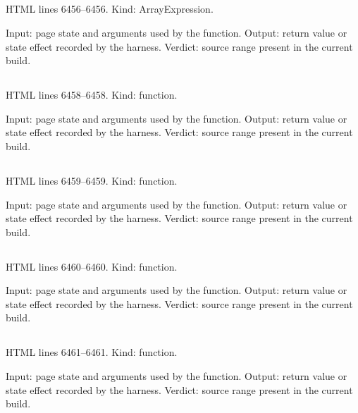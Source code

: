 \subsection*{\texttt{}}
\label{vf_302_CC_SEG_PALETTE}
HTML lines 6456--6456. Kind: ArrayExpression.

Input: page state and arguments used by the function.
Output: return value or state effect recorded by the harness.
Verdict: source range present in the current build.

\subsection*{\texttt{}}
\label{vf_303_ccSignal}
HTML lines 6458--6458. Kind: function.

Input: page state and arguments used by the function.
Output: return value or state effect recorded by the harness.
Verdict: source range present in the current build.

\subsection*{\texttt{}}
\label{vf_304_ccPlatform}
HTML lines 6459--6459. Kind: function.

Input: page state and arguments used by the function.
Output: return value or state effect recorded by the harness.
Verdict: source range present in the current build.

\subsection*{\texttt{}}
\label{vf_305_ccInstrumentKey}
HTML lines 6460--6460. Kind: function.

Input: page state and arguments used by the function.
Output: return value or state effect recorded by the harness.
Verdict: source range present in the current build.

\subsection*{\texttt{}}
\label{vf_306_ccOperator}
HTML lines 6461--6461. Kind: function.

Input: page state and arguments used by the function.
Output: return value or state effect recorded by the harness.
Verdict: source range present in the current build.

